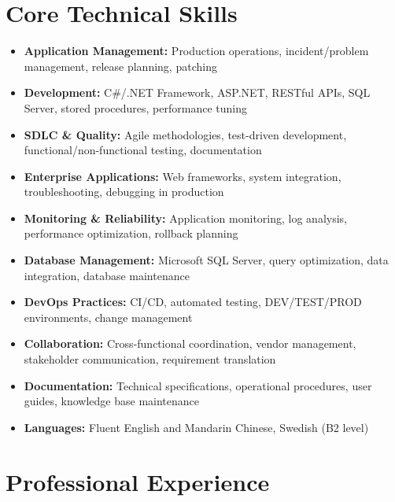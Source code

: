 \documentclass[11pt,a4paper]{article}
\begin{document}
\section*{Core Technical Skills}
\begin{itemize}[noitemsep]
\item \textbf{Application Management:} Production operations, incident/problem management, release planning, patching
\item \textbf{Development:} C\#/.NET Framework, ASP.NET, RESTful APIs, SQL Server, stored procedures, performance tuning
\item \textbf{SDLC \& Quality:} Agile methodologies, test-driven development, functional/non-functional testing, documentation
\item \textbf{Enterprise Applications:} Web frameworks, system integration, troubleshooting, debugging in production
\item \textbf{Monitoring \& Reliability:} Application monitoring, log analysis, performance optimization, rollback planning
\item \textbf{Database Management:} Microsoft SQL Server, query optimization, data integration, database maintenance
\item \textbf{DevOps Practices:} CI/CD, automated testing, DEV/TEST/PROD environments, change management
\item \textbf{Collaboration:} Cross-functional coordination, vendor management, stakeholder communication, requirement translation
\item \textbf{Documentation:} Technical specifications, operational procedures, user guides, knowledge base maintenance
\item \textbf{Languages:} Fluent English and Mandarin Chinese, Swedish (B2 level)
\end{itemize}

\section*{Professional Experience}
\end{document}

